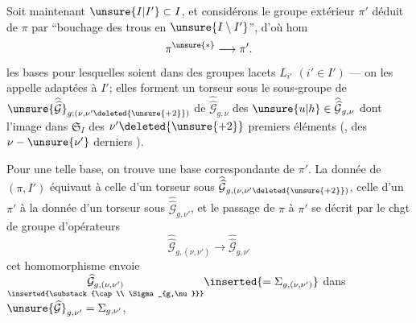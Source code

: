 
Soit maintenant $\unsure{I|I'}\subset I$,  et considérons le groupe extérieur $\pi'$ déduit de $\pi$ par ``bouchage des trous en $\unsure{I\setminus I'}$'', d'où hom
\[
\pi^{\unsure{*}}\longrightarrow\pi'.
\]
  les bases  pour lesquelles    soient dans des  groupes  lacets  $L_{i'}$ $(i'\in I')$ --- on les appelle adaptées à $I'$; elles forment un torseur  sous le sous-groupe de  $\unsure{\widehat{\widehat{\mathcal G}}}_{g;(\nu,\nu'\deleted{\unsure{+2}})}$ de $\widehat{\widehat{\mathcal G}}_{g,\nu}$   des $\unsure{u|h}\in\widehat{\widehat{\mathcal G}}_{g,\nu}$ dont l'image dans $\mathfrak S_I$   des $\nu'\deleted{\unsure{+2}}$ premiers éléments (, des $\nu-\unsure{\nu'}$ derniers ).


Pour une telle base, on trouve une base correspondante de $\pi'$.  La donnée de $(\pi,I')$ équivaut à celle d'un torseur sous $\widehat{\widehat{\mathcal G}}_{g,(\nu,\nu'\deleted{\unsure{+2}})}$, celle d'un $\pi'$ à  la donnée d'un torseur sous $\widehat{\widehat{\mathcal G}}_{g,\nu'}$, et le passage de $\pi$ à $\pi'$ se décrit par le chgt de groupe d'opérateurs
\[
\widehat{\widehat{\mathcal G}}_{g,(\nu,\nu')}\longrightarrow\widehat{\widehat{\mathcal G}}_{g,\nu'}
\]
cet homomorphisme envoie $\underset{\inserted{\substack{\cap\\ \Sigma_{g,\nu}}}}{\widehat{\mathcal G}_{g,(\nu,\nu')}}\inserted{=\Sigma_{g,(\nu,\nu')}}$ dans $\unsure{\widehat{\mathcal G}}_{g,\nu'}=\Sigma_{g,\nu'}$,

